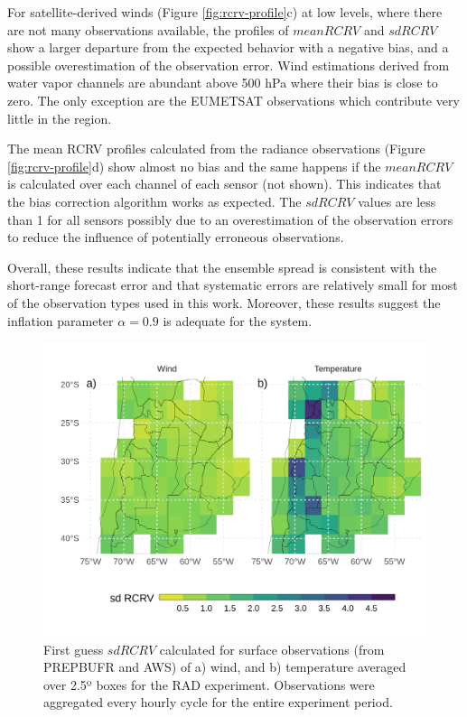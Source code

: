 \documentclass[authoryear,preprint,review,12pt]{elsarticle} %
\begin{document}
For satellite-derived winds (Figure \ref{fig:rcrv-profile}c) at low levels, where there are not many observations available, the profiles of \(mean RCRV\) and \(sd RCRV\) show a larger departure from the expected behavior with a negative bias, and a possible overestimation of the observation error. Wind estimations derived from water vapor channels are abundant above 500 hPa where their bias is close to zero. The only exception are the EUMETSAT observations which contribute very little in the region.

The mean RCRV profiles calculated from the radiance observations (Figure \ref{fig:rcrv-profile}d) show almost no bias and the same happens if the \(mean RCRV\) is calculated over each channel of each sensor (not shown). This indicates that the bias correction algorithm works as expected. The \(sd RCRV\) values are less than 1 for all sensors possibly due to an overestimation of the observation errors to reduce the influence of potentially erroneous observations.

Overall, these results indicate that the ensemble spread is consistent with the short-range forecast error and that systematic errors are relatively small for most of the observation types used in this work. Moreover, these results suggest the inflation parameter \(\alpha = 0.9\) is adequate for the system.



\begin{figure}
\includegraphics[width=1\linewidth]{../figures/rcrv-sfc-1} \caption{First guess \(sd RCRV\) calculated for surface observations (from PREPBUFR and AWS) of a) wind, and b) temperature averaged over 2.5º boxes for the RAD experiment. Observations were aggregated every hourly cycle for the entire experiment period.}\label{fig:rcrv-sfc}
\end{figure}
\end{document}
